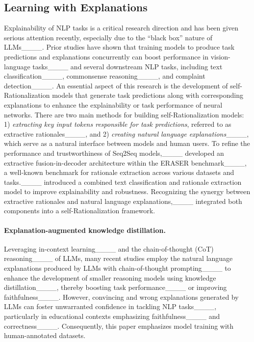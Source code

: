 \subsection{Learning with Explanations}
Explainability of NLP tasks is a critical research direction and has been given serious attention recently, especially due to the ``black box'' nature of LLMs____. Prior studies have shown that training models to produce task predictions and explanations concurrently can boost performance in vision-language tasks____ and several downstream NLP tasks, including text classification____, commonsense reasoning____, and complaint detection____. An essential aspect of this research is the development of self-Rationalization models that generate task predictions along with corresponding explanations to enhance the explainability or task performance of neural networks. There are two main methods for building self-Rationalization models: 1) \textit{extracting key input tokens responsible for task predictions}, referred to as extractive rationales____, and 2) \textit{creating natural language explanations}____, which serve as a natural interface between models and human users. To refine the performance and trustworthiness of Seq2Seq models,____ developed an extractive fusion-in-decoder architecture within the ERASER benchmark____, a well-known benchmark for rationale extraction across various datasets and tasks.____ introduced a combined text classification and rationale extraction model to improve explainability and robustness. Recognizing the synergy between extractive rationales and natural language explanations,____ integrated both components into a self-Rationalization framework.

\paragraph{Explanation-augmented knowledge distillation.}
Leveraging in-context learning____ and the chain-of-thought (CoT) reasoning____ of LLMs, many recent studies employ the natural language explanations produced by LLMs with chain-of-thought prompting____ to enhance the development of smaller reasoning models using knowledge distillation____, thereby boosting task performance____ or improving faithfulness____.
However, convincing and wrong explanations generated by LLMs can foster unwarranted confidence in tackling NLP tasks____, particularly in educational contexts emphasizing faithfulness____ and correctness____. Consequently, this paper emphasizes model training with human-annotated datasets.